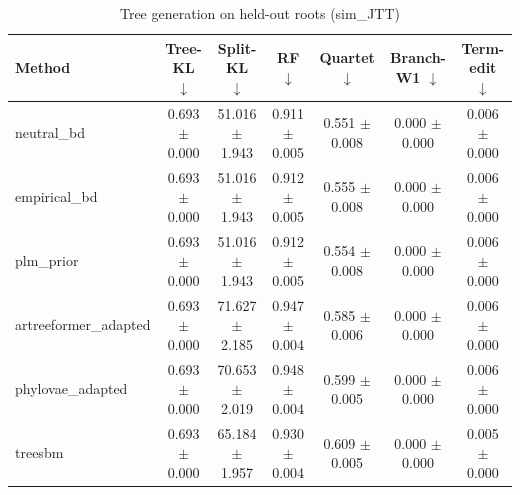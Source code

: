 \begin{table}[t]\centering
\caption{Tree generation on held-out roots (sim_JTT)}
\begin{tabular}{lcccccc}
\toprule
Method & Tree-KL $\downarrow$ & Split-KL $\downarrow$ & RF $\downarrow$ & Quartet $\downarrow$ & Branch-W1 $\downarrow$ & Term-edit $\downarrow$ \\
\midrule
neutral\_bd & 0.693 $\pm$ 0.000 & 51.016 $\pm$ 1.943 & 0.911 $\pm$ 0.005 & 0.551 $\pm$ 0.008 & 0.000 $\pm$ 0.000 & 0.006 $\pm$ 0.000 \\
empirical\_bd & 0.693 $\pm$ 0.000 & 51.016 $\pm$ 1.943 & 0.912 $\pm$ 0.005 & 0.555 $\pm$ 0.008 & 0.000 $\pm$ 0.000 & 0.006 $\pm$ 0.000 \\
plm\_prior & 0.693 $\pm$ 0.000 & 51.016 $\pm$ 1.943 & 0.912 $\pm$ 0.005 & 0.554 $\pm$ 0.008 & 0.000 $\pm$ 0.000 & 0.006 $\pm$ 0.000 \\
artreeformer\_adapted & 0.693 $\pm$ 0.000 & 71.627 $\pm$ 2.185 & 0.947 $\pm$ 0.004 & 0.585 $\pm$ 0.006 & 0.000 $\pm$ 0.000 & 0.006 $\pm$ 0.000 \\
phylovae\_adapted & 0.693 $\pm$ 0.000 & 70.653 $\pm$ 2.019 & 0.948 $\pm$ 0.004 & 0.599 $\pm$ 0.005 & 0.000 $\pm$ 0.000 & 0.006 $\pm$ 0.000 \\
treesbm & 0.693 $\pm$ 0.000 & 65.184 $\pm$ 1.957 & 0.930 $\pm$ 0.004 & 0.609 $\pm$ 0.005 & 0.000 $\pm$ 0.000 & 0.005 $\pm$ 0.000 \\
\bottomrule
\end{tabular}
\end{table}